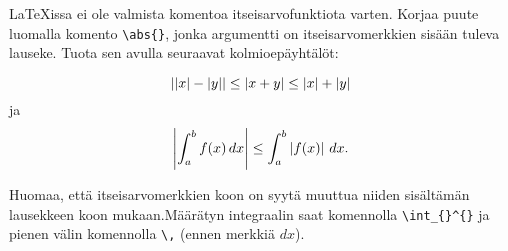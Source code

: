 
\begin{fframe}
    \begin{harj}
        \LaTeX issa ei ole valmista komentoa itseisarvofunktiota varten. Korjaa puute luomalla komento \lstinline-\abs{}-, jonka argumentti on itseisarvomerkkien sisään tuleva lauseke. Tuota sen avulla seuraavat kolmioepäyhtälöt:
        \begin{sample}
            \[
                \left|\left|x\right|-\left|y\right|\right|\leq \left|x+y\right|\leq\left|x\right|+\left|y\right|
            \]
            ja
            \[
                \left|\int_a^b f(x)\,dx\right| \leq\int_a^b\left|f(x)\right|\, dx.
            \]
        \end{sample}
        Huomaa, että itseisarvomerkkien koon on syytä muuttua niiden sisältämän lausekkeen koon mukaan.\vaihto Määrätyn integraalin saat komennolla \lstinline-\int_{}^{}- ja pienen välin komennolla \lstinline-\,- (ennen merkkiä \(dx\)).
    \end{harj}
\end{fframe}

